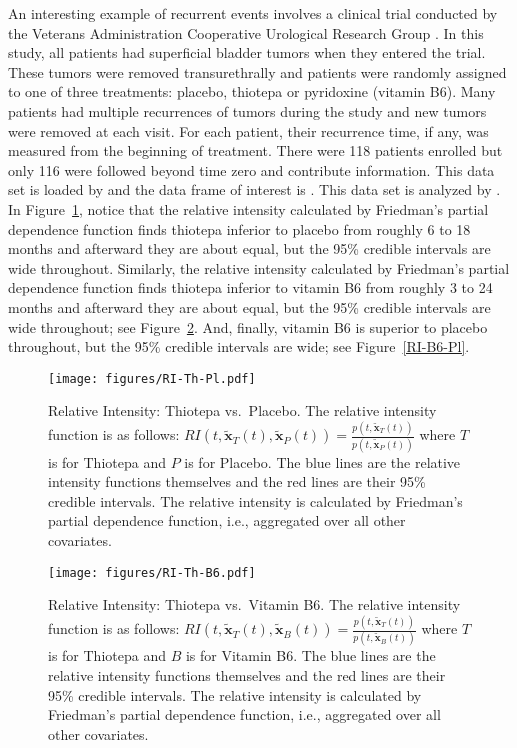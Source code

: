 \documentclass[article]{jss}
\begin{document}
An interesting example of recurrent events involves a clinical trial
conducted by the Veterans Administration Cooperative Urological
Research Group \citep{Byar90}.  In this study, all patients had
superficial bladder tumors when they entered the trial.  These tumors
were removed transurethrally and patients were randomly assigned to
one of three treatments: placebo, thiotepa or pyridoxine (vitamin B6).
Many patients had multiple recurrences of tumors during the study and
new tumors were removed at each visit.  For each patient, their
recurrence time, if any, was measured from the beginning of treatment.
There were 118 patients enrolled but only 116 were followed beyond
time zero and contribute information.  This data set is loaded by
 and the data frame of interest is
.  This data set is analyzed by
.  In
Figure~\ref{RI-Th-Pl}, notice that the relative intensity calculated
by Friedman's partial dependence function finds thiotepa inferior to
placebo from roughly 6 to 18 months and afterward they are about
equal, but the 95\% credible intervals are wide throughout.
Similarly, the relative intensity calculated by Friedman's partial
dependence function finds thiotepa inferior to vitamin B6 from roughly
3 to 24 months and afterward they are about equal, but the 95\%
credible intervals are wide throughout; see Figure~\ref{RI-Th-B6}.
And, finally, vitamin B6 is superior to placebo throughout, but the
95\% credible intervals are wide; see Figure~\ref{RI-B6-Pl}.
\begin{figure}[h]
\begin{center}
\texttt{[image: figures/RI-Th-Pl.pdf]}
\end{center}
\caption{\label{RI-Th-Pl}Relative Intensity: Thiotepa vs.\ Placebo.
  The relative intensity function is as follows:
  $RI(t,\tilde{\bm{x}}_T(t),\tilde{\bm{x}}_P(t))=\frac{p(t,\tilde{\bm{x}}_T(t))}{p(t,\tilde{\bm{x}}_P(t))}$
  where $T$ is for Thiotepa and $P$ is for Placebo.  The blue lines
  are the relative intensity functions themselves and the red lines
  are their 95\% credible intervals.  The relative intensity is
  calculated by Friedman's partial dependence function, i.e., 
  aggregated over all other covariates.}
\end{figure}

\begin{figure}[h]
\begin{center}
\texttt{[image: figures/RI-Th-B6.pdf]}
\end{center}
\caption{\label{RI-Th-B6}  
Relative Intensity: Thiotepa vs.\ Vitamin B6.
  The relative intensity function is as follows:
  $RI(t,\tilde{\bm{x}}_T(t),\tilde{\bm{x}}_B(t))=\frac{p(t,\tilde{\bm{x}}_T(t))}{p(t,\tilde{\bm{x}}_{B}(t))}$
  where $T$ is for Thiotepa and $B$ is for Vitamin B6.  The blue lines
  are the relative intensity functions themselves and the red lines
  are their 95\% credible intervals.  The relative intensity is
  calculated by Friedman's partial dependence function, i.e., 
  aggregated over all other covariates.}
\end{figure}
\end{document}
